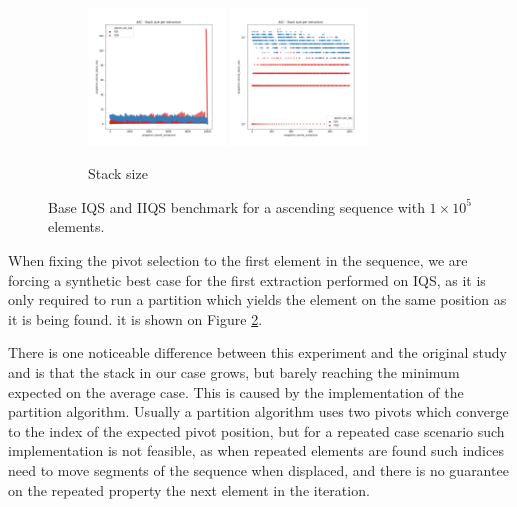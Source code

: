 \begin{figure}
    \begin{subfigure}[b]{\textwidth}
        \centering
        \includegraphics[width=0.40\textwidth]{./fragments/04_experimental_execution/images/01_basebenchmark_02_sort_a_case.png.2_0.png}
        \includegraphics[width=0.40\textwidth]{./fragments/04_experimental_execution/images/01_basebenchmark_02_sort_a_case.png.2_1.png}
        \caption{Stack size}
        \label{FIG:BENCHMARK_02_ASC_CASE__0_0}
    \end{subfigure}
    
    \caption{Base IQS and IIQS benchmark for a ascending sequence with $1\times10^5$ elements.}
    \label{FIG:BENCHMARK_02_ASC_CASE}
\end{figure}

When fixing the pivot selection to the first element in the sequence, we are forcing a synthetic best case for the first extraction performed on IQS, as it is only required to run a partition which yields the element on the same position as it is being found. it is shown on Figure \ref{FIG:BENCHMARK_02_ASC_CASE}. 

There is one noticeable difference between this experiment and the original study and is that the stack in our case grows, but barely reaching the minimum expected on the average case. This is caused by the implementation of the partition algorithm. Usually a partition algorithm uses two pivots which converge to the index of the expected pivot position, but for a repeated case scenario such implementation is not feasible, as when repeated elements are found such indices need to move segments of the sequence when displaced, and there is no guarantee on the repeated property the next element in the iteration.\\

